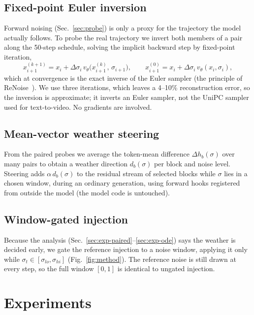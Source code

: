 \documentclass[11pt,a4paper]{article}
\begin{document}
\subsection{Fixed-point Euler inversion}
\label{sec:fp}
Forward noising (Sec.~\ref{sec:probe}) is only a proxy for the trajectory the model actually follows. To probe the real trajectory we invert both members of a pair along the 50-step schedule, solving the implicit backward step by fixed-point iteration,
\begin{equation}
x_{i+1}^{(k+1)} = x_i + \Delta\sigma_i\, v_\theta\!\big(x_{i+1}^{(k)},\,\sigma_{i+1}\big),\qquad x_{i+1}^{(0)} = x_i + \Delta\sigma_i\, v_\theta(x_i,\sigma_i),
\end{equation}
which at convergence is the exact inverse of the Euler sampler (the principle of ReNoise~\cite{renoise}). We use three iterations, which leaves a 4--10\% reconstruction error, so the inversion is approximate; it inverts an Euler sampler, not the UniPC sampler used for text-to-video. No gradients are involved.

\subsection{Mean-vector weather steering}
From the paired probes we average the token-mean difference $\Delta h_b(\sigma)$ over many pairs to obtain a weather direction $d_b(\sigma)$ per block and noise level.
Steering adds $\alpha\, d_b(\sigma)$ to the residual stream of selected blocks while $\sigma$ lies in a chosen window, during an ordinary generation, using forward hooks registered from outside the model (the model code is untouched).

\subsection{Window-gated injection}
\label{sec:gate}
Because the analysis (Sec.~\ref{sec:exp-paired}--\ref{sec:exp-ode}) says the weather is decided early, we gate the reference injection to a noise window, applying it only while $\sigma_t \in [\sigma_{lo}, \sigma_{hi}]$ (Fig.~\ref{fig:method}).
The reference noise is still drawn at every step, so the full window $[0,1]$ is identical to ungated injection.

\section{Experiments}
\end{document}

